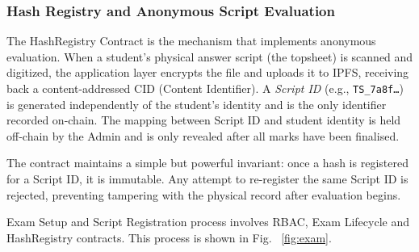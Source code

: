 \documentclass[conference]{IEEEtran}
\begin{document}


\subsubsection{Hash Registry and Anonymous Script Evaluation}
\label{subsec:hashregistry}

The HashRegistry Contract is the mechanism that implements anonymous
evaluation. When a student's physical answer script (the topsheet) is scanned and digitized,
the application layer encrypts the file and uploads it to IPFS, receiving
back a content-addressed CID (Content Identifier). A \emph{Script ID}
(e.g., \texttt{TS\_7a8f\ldots}) is generated independently of the student's
identity and is the only identifier recorded on-chain. The mapping between
Script ID and student identity is held off-chain by the Admin and is only
revealed after all marks have been finalised.

The contract maintains a simple but powerful invariant: once a hash is
registered for a Script ID, it is immutable. Any attempt to re-register
the same Script ID is rejected, preventing tampering with the physical
record after evaluation begins.

Exam Setup and Script Registration process involves RBAC, Exam Lifecycle and HashRegistry contracts. This process is shown in Fig. ~\ref{fig:exam}.





\end{document}
